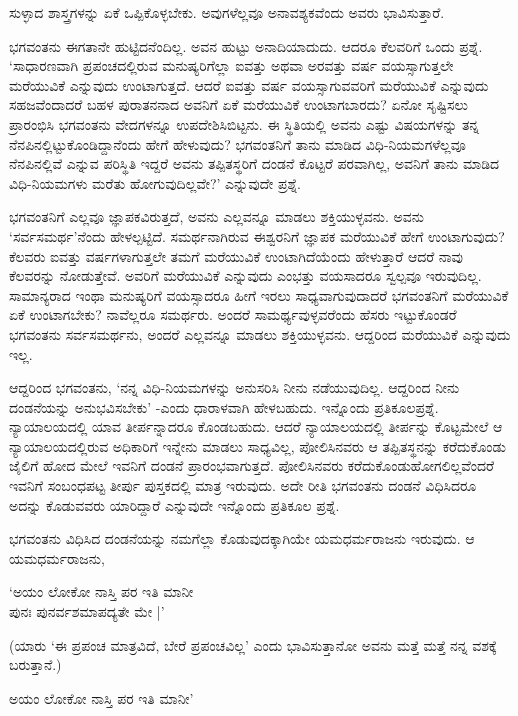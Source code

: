 ಸುಳ್ಳಾದ ಶಾಸ್ತ್ರಗಳನ್ನು ಏಕೆ ಒಪ್ಪಿಕೊಳ್ಳಬೇಕು. ಅವುಗಳೆಲ್ಲವೂ ಅನಾವಶ್ಯಕವೆಂದು ಅವರು ಭಾವಿಸುತ್ತಾರೆ.

ಭಗವಂತನು ಈಗತಾನೇ ಹುಟ್ಟಿದನೆಂದಿಲ್ಲ. ಅವನ ಹುಟ್ಟು ಅನಾದಿಯಾದುದು. ಆದರೂ ಕೆಲವರಿಗೆ ಒಂದು ಪ್ರಶ್ನೆ. `ಸಾಧಾರಣವಾಗಿ ಪ್ರಪಂಚದಲ್ಲಿರುವ ಮನುಷ್ಯರಿಗೆಲ್ಲಾ ಐವತ್ತು ಅಥವಾ ಅರವತ್ತು ವರ್ಷ ವಯಸ್ಸಾಗುತ್ತಲೇ ಮರೆಯುವಿಕೆ ಎನ್ನುವುದು ಉಂಟಾಗುತ್ತದೆ. ಆದರೆ ಐವತ್ತು ವರ್ಷ ವಯಸ್ಸಾಗುವವರಿಗೆ ಮರೆಯುವಿಕೆ ಎನ್ನುವುದು ಸಹಜವೆಂದಾದರೆ ಬಹಳ ಪುರಾತನನಾದ ಅವನಿಗೆ ಏಕೆ ಮರೆಯುವಿಕೆ ಉಂಟಾಗಬಾರದು? ಏನೋ ಸೃಷ್ಟಿಸಲು ಪ್ರಾರಂಭಿಸಿ ಭಗವಂತನು ವೇದಗಳನ್ನೂ ಉಪದೇಶಿಸಿಬಿಟ್ಟನು. ಈ ಸ್ಥಿತಿಯಲ್ಲಿ ಅವನು ಎಷ್ಟು ವಿಷಯಗಳನ್ನು ತನ್ನ ನೆನಪಿನಲ್ಲಿಟ್ಟುಕೊಂಡಿದ್ದಾನೆಂದು ಹೇಗೆ ಹೇಳುವುದು? ಭಗವಂತನಿಗೆ ತಾನು ಮಾಡಿದ ವಿಧಿ-ನಿಯಮಗಳೆಲ್ಲವೂ ನೆನಪಿನಲ್ಲಿವೆ ಎನ್ನುವ ಪರಿಸ್ಥಿತಿ ಇದ್ದರೆ ಅವನು ತಪ್ಪಿತಸ್ಥರಿಗೆ ದಂಡನೆ ಕೊಟ್ಟರೆ ಪರವಾಗಿಲ್ಲ, ಅವನಿಗೆ ತಾನು ಮಾಡಿದ ವಿಧಿ-ನಿಯಮಗಳು ಮರೆತು ಹೋಗುವುದಿಲ್ಲವೇ?' ಎನ್ನುವುದೇ ಪ್ರಶ್ನೆ.

ಭಗವಂತನಿಗೆ ಎಲ್ಲವೂ ಜ್ಞಾಪಕವಿರುತ್ತದೆ, ಅವನು ಎಲ್ಲವನ್ನೂ ಮಾಡಲು ಶಕ್ತಿಯುಳ್ಳವನು. ಅವನು `ಸರ್ವಸಮರ್ಥ'ನೆಂದು ಹೇಳಲ್ಪಟ್ಟಿದೆ. ಸಮರ್ಥನಾಗಿರುವ ಈಶ್ವರನಿಗೆ ಜ್ಞಾಪಕ ಮರೆಯುವಿಕೆ ಹೇಗೆ ಉಂಟಾಗುವುದು? ಕೆಲವರು ಐವತ್ತು ವರ್ಷಗಳಾಗುತ್ತಲೇ ತಮಗೆ ಮರೆಯುವಿಕೆ ಉಂಟಾಗಿದೆಯೆಂದು ಹೇಳುತ್ತಾರೆ ಆದರೆ ನಾವು ಕೆಲವರನ್ನು ನೋಡುತ್ತೇವೆ. ಅವರಿಗೆ ಮರೆಯುವಿಕೆ ಎನ್ನುವುದು ಎಂಭತ್ತು ವಯಸಾದರೂ ಸ್ವಲ್ಪವೂ ಇರುವುದಿಲ್ಲ. ಸಾಮಾನ್ಯರಾದ ಇಂಥಾ ಮನುಷ್ಯರಿಗೆ ವಯಸ್ಸಾದರೂ ಹೀಗೆ ಇರಲು ಸಾಧ್ಯವಾಗುವುದಾದರೆ ಭಗವಂತನಿಗೆ ಮರೆಯುವಿಕೆ ಏಕೆ ಉಂಟಾಗಬೇಕು? ನಾವೆಲ್ಲರೂ ಸಮರ್ಥರು. ಅಂದರೆ ಸಾಮರ್ಥ್ಯವುಳ್ಳವರೆಂದು ಹೆಸರು ಇಟ್ಟುಕೊಂಡರೆ ಭಗವಂತನು ಸರ್ವಸಮರ್ಥನು, ಅಂದರೆ ಎಲ್ಲವನ್ನೂ ಮಾಡಲು ಶಕ್ತಿಯುಳ್ಳವನು. ಆದ್ದರಿಂದ ಮರೆಯುವಿಕೆ ಎನ್ನುವುದು ಇಲ್ಲ.

ಆದ್ದರಿಂದ ಭಗವಂತನು, `ನನ್ನ ವಿಧಿ-ನಿಯಮಗಳನ್ನು ಅನುಸರಿಸಿ ನೀನು ನಡೆಯುವುದಿಲ್ಲ. ಆದ್ದರಿಂದ ನೀನು ದಂಡನೆಯನ್ನು ಅನುಭವಿಸಬೇಕು' -ಎಂದು ಧಾರಾಳವಾಗಿ ಹೇಳಬಹುದು. ಇನ್ನೊಂದು ಪ್ರತಿಕೂಲಪ್ರಶ್ನೆ. ನ್ಯಾಯಾಲಯದಲ್ಲಿ ಯಾವ ತೀರ್ಪನ್ನಾದರೂ ಕೊಂಡಬಹುದು. ಆದರೆ ನ್ಯಾಯಾಲಯದಲ್ಲಿ ತೀರ್ಪನ್ನು ಕೊಟ್ಟಮೇಲೆ ಆ ನ್ಯಾಯಾಲಯದಲ್ಲಿರುವ ಅಧಿಕಾರಿಗೆ ಇನ್ನೇನು ಮಾಡಲು ಸಾಧ್ಯವಿಲ್ಲ, ಪೋಲಿಸಿನವರು ಆ ತಪ್ಪಿತಸ್ಥನನ್ನು ಕರೆದುಕೊಂಡು ಜೈಲಿಗೆ ಹೋದ ಮೇಲೆ ಇವನಿಗೆ ದಂಡನೆ ಪ್ರಾರಂಭವಾಗುತ್ತದೆ. ಪೋಲಿಸಿನವರು ಕರೆದುಕೊಂಡುಹೋಗಲಿಲ್ಲವೆಂದರೆ ಇವನಿಗೆ ಸಂಬಂಧಪಟ್ಟ ತೀರ್ಪು ಪುಸ್ತಕದಲ್ಲಿ ಮಾತ್ರ ಇರುವುದು. ಅದೇ ರೀತಿ ಭಗವಂತನು ದಂಡನೆ ವಿಧಿಸಿದರೂ ಅದನ್ನು ಕೊಡುವವರು ಯಾರಿದ್ದಾರೆ ಎನ್ನುವುದೇ ಇನ್ನೊಂದು ಪ್ರತಿಕೂಲ ಪ್ರಶ್ನೆ.

ಭಗವಂತನು ವಿಧಿಸಿದ ದಂಡನೆಯನ್ನು ನಮಗೆಲ್ಲಾ ಕೊಡುವುದಕ್ಕಾಗಿಯೇ ಯಮಧರ್ಮರಾಜನು ಇರುವುದು. ಆ ಯಮಧರ್ಮರಾಜನು,

\begin{shloka}
`ಅಯಂ ಲೋಕೋ ನಾಸ್ತಿ ಪರ ಇತಿ ಮಾನೀ\\
ಪುನಃ ಪುನರ್ವಶಮಾಪದ್ಯತೇ ಮೇ |'
\end{shloka}

(ಯಾರು `ಈ ಪ್ರಪಂಚ ಮಾತ್ರವಿದೆ, ಬೇರೆ ಪ್ರಪಂಚವಿಲ್ಲ' ಎಂದು ಭಾವಿಸುತ್ತಾನೋ ಅವನು ಮತ್ತೆ ಮತ್ತೆ ನನ್ನ ವಶಕ್ಕೆ ಬರುತ್ತಾನೆ.)

\begin{shloka}
ಅಯಂ ಲೋಕೋ ನಾಸ್ತಿ ಪರ ಇತಿ ಮಾನೀ'
\end{shloka}

